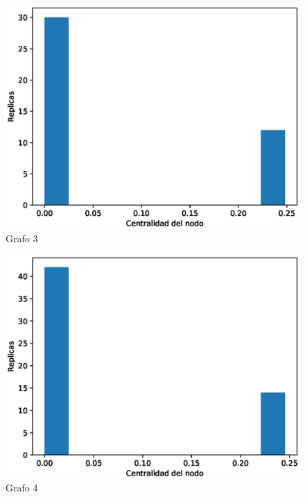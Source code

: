 \documentclass{article}
\begin{document}
\begin{figure}[H]
    \includegraphics[scale=0.6]{hist-cercania-3}
    \caption{Grafo 3}
    \label{fig:matriz}
\end{figure}
\begin{figure}[H]
    \includegraphics[scale=0.6]{hist-cercania-4}
    \caption{Grafo 4}
    \label{fig:matriz}
\end{figure}
\end{document}
